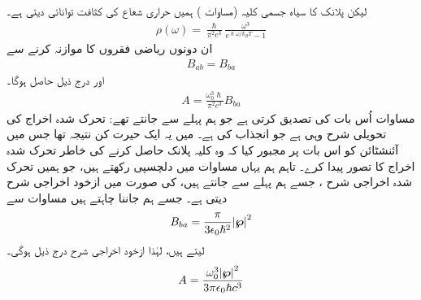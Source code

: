 لیکن پلانک کا سیاہ جسمی کلیہ (مساوات ) ہمیں حراری شعاع کی کثافت توانائی دیتی ہے۔
\begin{align}
	\rho(\omega) = \frac{\hslash}{\pi^2c^3}\frac{\omega^3}{e^{\hslash\omega/k_BT}-1}
\end{align}
ان دونوں ریاضی فقروں کا موازنہ کرنے سے 
\begin{align}\label{مساوات_تابع_مضطرب_برابر_شرح}
	B_{ab} = B_{ba}
\end{align}
اور درج ذیل حاصل ہوگا۔
\begin{align}\label{مساوات_تابع_مضطرب_شرح_خود_با_خود_اخراج}
	A = \frac{\omega^3_0\hslash}{\pi^2c^3}B_{ba}
\end{align}
مساوات  اُس بات کی تصدیق کرتی ہے جو ہم پہلے سے جانتے تھے: تحرک شدہ اخراج کی تحویلی شرح وہی ہے جو انجذاب کی ہے۔ میں یہ ایک حیرت کن نتیجہ تھا جس میں آئنشٹائن کو اس بات پر مجبور کیا کہ وہ کلیہ پلانک حاصل کرنے کی خاطر تحرک شدہ اخراج کا تصور پیدا کرے۔ تاہم ہم یہاں مساوات  میں دلچسپی رکھتے ہیں، جو ہمیں تحرک شدہ اخراجی شرح ، جسے ہم پہلے سے جانتے ہیں، کی صورت میں ازخود اخراجی شرح  دیتی ہے۔ جسے ہم جاننا چاہتے ہیں مساوات  سے
\begin{align}
	B_{ba} = \frac{\pi}{3\epsilon_0\hslash^2}\abs{{{\boldsymbol{\wp}}}}^2
\end{align}
لیتے ہیں، لہٰذا ازخود اخراجی شرح درج ذیل ہوگی۔
\begin{align}\label{مساوات_تابع_مضطرب_خود_با_خود_شرح_حتمی}
	A = \frac{\omega^3_0\abs{{{\boldsymbol{\wp}}}}^2}{3\pi\epsilon_0\hslash c^3}
\end{align}

